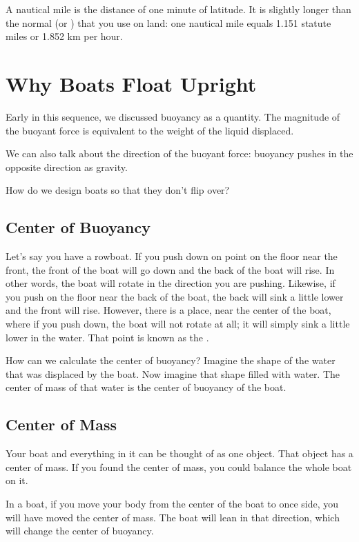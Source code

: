A nautical mile is the distance of one minute of latitude. It is slightly longer than the normal (or ) that you use on land: one nautical mile equals 1.151 statute miles or 1.852 km per hour.

\section{Why Boats Float Upright}

Early in this sequence, we discussed buoyancy as a quantity. The magnitude of the buoyant force is equivalent to the weight of the liquid displaced.

We can also talk about the direction of the buoyant force: buoyancy pushes in the opposite direction as gravity.

How do we design boats so that they don't flip over?

\subsection{Center of Buoyancy}

Let's say you have a rowboat. If you push down on point on the floor near the front, the front of the boat will go down and the back of the boat will rise. In other words, the boat will rotate in the direction you are pushing.
Likewise, if you push on the floor near the back of the boat, the back will sink a little lower and the front will rise. However, there is a place, near the center of the boat, where if you push down, the boat will not rotate at all; it will simply sink a little lower
in the water. That point is known as the .

How can we calculate the center of buoyancy?  Imagine the shape of the water that was displaced by the boat. Now imagine that shape filled with water. The center of mass of that water is the center of buoyancy of the boat.

\subsection{Center of Mass}
Your boat and everything in it can be thought of as one object.  That object has a center of mass. If you found the center of mass, you could balance the whole boat on it.

In a boat,  if you move your body from the center of the boat to once side, you will have moved the center of mass. The boat will lean in that direction, which will change the center of buoyancy.

